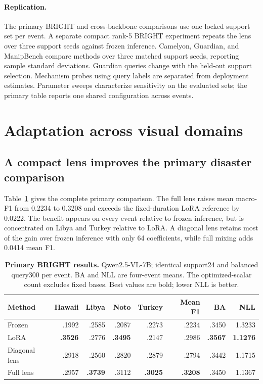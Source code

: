 \documentclass{article}
\begin{document}
\paragraph{Replication.}
The primary BRIGHT and cross-backbone comparisons use one locked support set per event. A separate compact rank-5 BRIGHT experiment repeats the lens over three support seeds against frozen inference. Camelyon, Guardian, and ManipBench compare methods over three matched support seeds, reporting sample standard deviations. Guardian queries change with the held-out support selection. Mechanism probes using query labels are separated from deployment estimates. Parameter sweeps characterize sensitivity on the evaluated sets; the primary table reports one shared configuration across events.

\section{Adaptation across visual domains}
\label{sec:results}
\subsection{A compact lens improves the primary disaster comparison}
Table~\ref{tab:main} gives the complete primary comparison. The full lens raises mean macro-F1 from 0.2234 to 0.3208 and exceeds the fixed-duration LoRA reference by 0.0222. The benefit appears on every event relative to frozen inference, but is concentrated on Libya and Turkey relative to LoRA. A diagonal lens retains most of the gain over frozen inference with only 64 coefficients, while full mixing adds 0.0414 mean F1.

\begin{table}[t]
\caption{\textbf{Primary BRIGHT results.} Qwen2.5-VL-7B; identical support24 and balanced query300 per event. BA and NLL are four-event means. The optimized-scalar count excludes fixed bases. Best values are bold; lower NLL is better.}
\label{tab:main}
\centering\small
\begin{tabular}{@{}lrrrrrrr@{}}
\toprule
Method & Hawaii & Libya & Noto & Turkey & Mean F1 & BA & NLL\\
\midrule
Frozen & .1992 & .2585 & .2087 & .2273 & .2234 & .3450 & 1.3233\\
LoRA & \textbf{.3526} & .2776 & \textbf{.3495} & .2147 & .2986 & \textbf{.3567} & \textbf{1.1276}\\
Diagonal lens & .2918 & .2560 & .2820 & .2879 & .2794 & .3442 & 1.1715\\
Full lens & .2957 & \textbf{.3739} & .3112 & \textbf{.3025} & \textbf{.3208} & .3450 & 1.1367\\
\bottomrule
\end{tabular}
\end{table}
\end{document}
